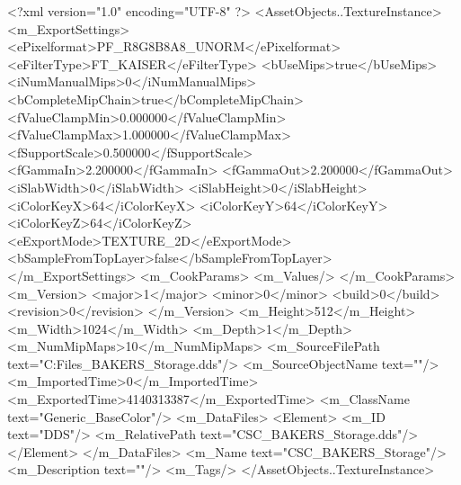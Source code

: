 <?xml version="1.0" encoding="UTF-8" ?>
<AssetObjects..TextureInstance>
	<m_ExportSettings>
		<ePixelformat>PF_R8G8B8A8_UNORM</ePixelformat>
		<eFilterType>FT_KAISER</eFilterType>
		<bUseMips>true</bUseMips>
		<iNumManualMips>0</iNumManualMips>
		<bCompleteMipChain>true</bCompleteMipChain>
		<fValueClampMin>0.000000</fValueClampMin>
		<fValueClampMax>1.000000</fValueClampMax>
		<fSupportScale>0.500000</fSupportScale>
		<fGammaIn>2.200000</fGammaIn>
		<fGammaOut>2.200000</fGammaOut>
		<iSlabWidth>0</iSlabWidth>
		<iSlabHeight>0</iSlabHeight>
		<iColorKeyX>64</iColorKeyX>
		<iColorKeyY>64</iColorKeyY>
		<iColorKeyZ>64</iColorKeyZ>
		<eExportMode>TEXTURE_2D</eExportMode>
		<bSampleFromTopLayer>false</bSampleFromTopLayer>
	</m_ExportSettings>
	<m_CookParams>
		<m_Values/>
	</m_CookParams>
	<m_Version>
		<major>1</major>
		<minor>0</minor>
		<build>0</build>
		<revision>0</revision>
	</m_Version>
	<m_Height>512</m_Height>
	<m_Width>1024</m_Width>
	<m_Depth>1</m_Depth>
	<m_NumMipMaps>10</m_NumMipMaps>
	<m_SourceFilePath text="C:\Users\Shadow\Desktop\Working Files\Textures\CSC_BAKERS_Storage.dds"/>
	<m_SourceObjectName text=""/>
	<m_ImportedTime>0</m_ImportedTime>
	<m_ExportedTime>4140313387</m_ExportedTime>
	<m_ClassName text="Generic_BaseColor"/>
	<m_DataFiles>
		<Element>
			<m_ID text="DDS"/>
			<m_RelativePath text="CSC_BAKERS_Storage.dds"/>
		</Element>
	</m_DataFiles>
	<m_Name text="CSC_BAKERS_Storage"/>
	<m_Description text=""/>
	<m_Tags/>
</AssetObjects..TextureInstance>

